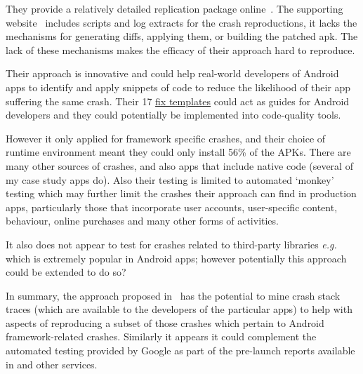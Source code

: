 They provide a relatively detailed replication package online~. The supporting website~ includes scripts and log extracts for the crash reproductions, it lacks the mechanisms for generating diffs, applying them, or building the patched \Gls{apk}. The lack of these mechanisms makes the efficacy of their approach hard to reproduce.

Their approach is innovative and could help real-world developers of Android apps to identify and apply snippets of code to reduce the likelihood of their app suffering the same crash. Their 17 \href{https://github.com/CraftDroid/ExpData/tree/master/Fix_Templates}{fix templates} could act as guides for Android developers and they could potentially be implemented into code-quality tools.
    
However it only applied for framework specific crashes, and their choice of runtime environment meant they could only install 56\% of the APKs. There are many other sources of crashes, and also apps that include native code (several of my case study apps do). Also their testing is limited to automated `monkey' testing which may further limit the crashes their approach can find in production apps, particularly those that incorporate user accounts, user-specific content, behaviour, online purchases and many other forms of activities.

It also does not appear to test for crashes related to third-party libraries \emph{e.g.}~ which is extremely popular in Android apps; however potentially this approach could be extended to do so?

In summary, the approach proposed in~ has the potential to mine crash stack traces (which are available to the developers of the particular apps) to help with aspects of reproducing a subset of those crashes which pertain to Android framework-related crashes. Similarly it appears it could complement the automated testing provided by Google as part of the pre-launch reports available in  and other services. 

